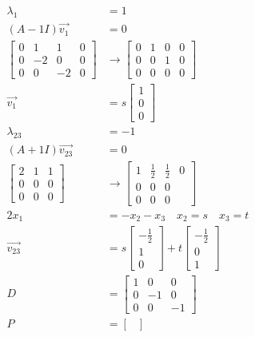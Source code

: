 \documentclass{math}
\begin{document}
\begin{align*}
  \lambda_1 &= 1 \\
  (A-1I)\vec{v_1} &= 0 \\
  \begin{bmatrix}
    0 & 1 & 1 & 0 \\
    0 & -2 & 0 & 0 \\
    0 & 0 & -2 & 0
  \end{bmatrix} &\to \begin{bmatrix}
    0 & 1 & 0 & 0 \\
    0 & 0 & 1 & 0 \\
    0 & 0 & 0 & 0
  \end{bmatrix} \\
  \vec{v_1} &= s\begin{bmatrix}1 \\ 0 \\ 0\end{bmatrix} \\
  \lambda_{23} &= -1 \\
  (A+1I)\vec{v_{23}} &= 0 \\
  \begin{bmatrix}
    2 & 1 & 1 \\
    0 & 0 & 0 \\
    0 & 0 & 0
  \end{bmatrix} &\to \begin{bmatrix}
    1 & \frac{1}{2} & \frac{1}{2} & 0 \\
    0 & 0 & 0 \\
    0 & 0 & 0
  \end{bmatrix} \\
  2x_1 &= -x_2-x_3 \quad x_2 = s \quad x_3 = t \\
  \vec{v_{23}} &= s\begin{bmatrix}-\frac{1}{2} \\ 1 \\ 0\end{bmatrix}+
    t\begin{bmatrix}-\frac{1}{2} \\ 0 \\ 1\end{bmatrix} \\
  D &= \begin{bmatrix}
    1 & 0 & 0 \\
    0 & -1 & 0 \\
    0 & 0 & -1
  \end{bmatrix} \\
  P &= \begin{bmatrix}

\end{bmatrix}
\end{align*}
\end{document}
